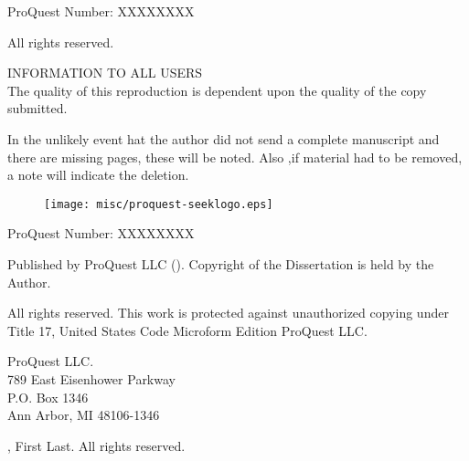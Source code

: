 \documentclass[12pt]{report}
\newcommand{\thesisname}{First Last}
\newcommand{\graddate}{\the\year} %
\begin{document}
\newpage



\thispagestyle{empty}
\begin{center}
ProQuest Number: XXXXXXXX

\vspace{.45in}

All rights reserved.

\vspace{.1in}

INFORMATION TO ALL USERS\\
The quality of this reproduction is dependent upon the quality of the copy submitted.
\vspace{.2in}

In the unlikely event hat  the author did not send a complete manuscript and there are missing pages, these will be  noted. Also ,if material had to be removed, a note will indicate the deletion.

\vspace{.1in}

\begin{figure}[H]
  \centering
  \texttt{[image: misc/proquest-seeklogo.eps]}
\end{figure}

\vspace{.1in}

ProQuest Number: XXXXXXXX

\vspace{.1in}

Published  by  ProQuest  LLC (\the\year).        Copyright of the Dissertation is held by the Author.

\vspace{.2in}

All rights reserved. This work is protected against  unauthorized copying under Title 17, United States Code Microform Edition {\textcopyright} ProQuest  LLC.

\vspace{.2in}

ProQuest LLC.\\
789 East Eisenhower Parkway\\
P.O. Box 1346\\
Ann Arbor, MI  48106-1346

\end{center}
\newpage

%
\setcounter{page}{2}
\thispagestyle{empty}
%
\begin{center}
{
  \vspace*{\fill}

  {\textcopyright} \graddate, \thesisname. All rights reserved.
}

\end{center}
\end{document}
